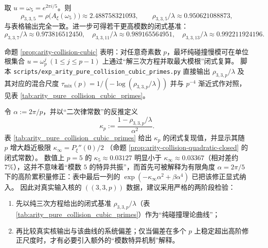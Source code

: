 \begin{remark}\label{cor:arity-335-rho-closed-form}
取 \(u=\omega_5=e^{2\pi i/5}\)。则
$$
\rho_{3,3,5}=\rho\bigl(A_\xi(\omega_5)\bigr)\approx 2.488758321093,
\qquad
\rho_{3,3,5}/\lambda\approx 0.950621088873,
$$
与表格输出完全一致。进一步可得若干更高模数的闭式基准：
$$
\rho_{3,3,7}/\lambda\approx 0.973816512450,\quad
\rho_{3,3,11}/\lambda\approx 0.989165564951,\quad
\rho_{3,3,13}/\lambda\approx 0.992211924196.
$$
\end{remark}

\begin{remark}\label{rem:arity-collision-cubic-primes-table}
命题 \ref{prop:arity-collision-cubic} 表明：对任意奇素数 \(p\)，最坏纯碰撞慢模可在单位根集合 \(u=\omega_p^j\ (1\le j\le p-1)\) 上通过“解三次方程并取最大模根”闭式复算。
脚本 \texttt{scripts/exp\_arity\_pure\_collision\_cubic\_primes.py} 直接输出
\(
\rho_{3,3,p}/\lambda
\)
及其对应的混合尺度
\(
\tau_{\mathrm{mix}}(p)=1/(-\log(\rho_{3,3,p}/\lambda))
\)
并与 \(p^{-4}\) 渐近式作对照，见表 \ref{tab:arity_pure_collision_cubic_primes}。
\end{remark}


\begin{remark}[两阶段可证伪检验：\texorpdfstring{$p=5$}{p=5} 的“经验二次律” vs \texorpdfstring{$\kappa_\infty$}{kappa_infty} 的“理论二次律”]\label{rem:arity-kappa-empirical-vs-theory}
令 \(\alpha:=2\pi/p\)，并以“二次律常数”的反推定义
\[
\kappa_p:=\frac{1-\rho_{3,3,p}/\lambda}{\alpha^2}.
\]
表 \ref{tab:arity_pure_collision_cubic_primes} 给出 \(\kappa_p\) 的闭式复现值，并显示其随 \(p\) 增大趋近极限
\(
\kappa_\infty=P_\xi''(0)/2
\)
（命题 \ref{prop:arity-collision-quadratic-closed} 的闭式常数）。
数值上 \(p=5\) 的 \(\kappa_5\approx 0.03127\) 明显小于 \(\kappa_\infty\approx 0.03367\)（相对差约 \(7\%\)），这并不意味着“模数 \(5\) 的特异共振”，而首先可被解释为有限角度 \(\alpha=2\pi/5\) 下的高阶累积量修正：表中最后一列的 \(\exp(-\kappa_\infty\alpha^2+\beta\alpha^4)\) 已把该修正显式纳入。
因此对真实输入核的 \(((3,3,p))\) 数据，建议采用严格的两阶段检验：
\begin{enumerate}
  \item 先以纯三次方程给出的闭式基准 \(\rho_{3,3,p}/\lambda\)（表 \ref{tab:arity_pure_collision_cubic_primes}）作为“纯碰撞理论曲线”；
  \item 再比较真实核输出与该曲线的系统偏差；仅当偏差在多个 \(p\) 上稳定超出高阶修正尺度时，才有必要引入额外的“模数特异机制”解释。
\end{enumerate}
\end{remark}

